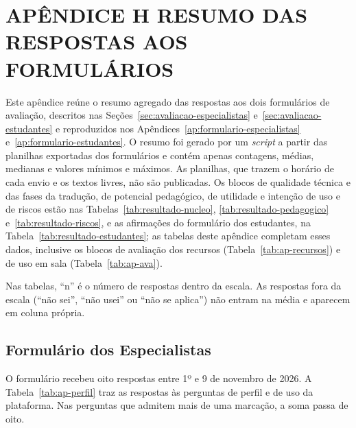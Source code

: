 \chapter[APÊNDICE H -- RESUMO DAS RESPOSTAS AOS FORMULÁRIOS]{{\centering APÊNDICE H \textendash{} RESUMO DAS RESPOSTAS AOS FORMULÁRIOS}}  \label{ap:respostas}

Este apêndice reúne o resumo agregado das respostas aos dois formulários de avaliação, descritos nas Seções~\ref{sec:avaliacao-especialistas} e~\ref{sec:avaliacao-estudantes} e reproduzidos nos Apêndices~\ref{ap:formulario-especialistas} e~\ref{ap:formulario-estudantes}. O resumo foi gerado por um \textit{script} a partir das planilhas exportadas dos formulários e contém apenas contagens, médias, medianas e valores mínimos e máximos. As planilhas, que trazem o horário de cada envio e os textos livres, não são publicadas. Os blocos de qualidade técnica e das fases da tradução, de potencial pedagógico, de utilidade e intenção de uso e de riscos estão nas Tabelas~\ref{tab:resultado-nucleo}, \ref{tab:resultado-pedagogico} e~\ref{tab:resultado-riscos}, e as afirmações do formulário dos estudantes, na Tabela~\ref{tab:resultado-estudantes}; as tabelas deste apêndice completam esses dados, inclusive os blocos de avaliação dos recursos (Tabela~\ref{tab:ap-recursos}) e de uso em sala (Tabela~\ref{tab:ap-ava}).

Nas tabelas, ``n'' é o número de respostas dentro da escala. As respostas fora da escala (``não sei'', ``não usei'' ou ``não se aplica'') não entram na média e aparecem em coluna própria.

\section{Formulário dos Especialistas}

O formulário recebeu oito respostas entre 1º e 9 de novembro de 2026. A Tabela~\ref{tab:ap-perfil} traz as respostas às perguntas de perfil e de uso da plataforma. Nas perguntas que admitem mais de uma marcação, a soma passa de oito.

